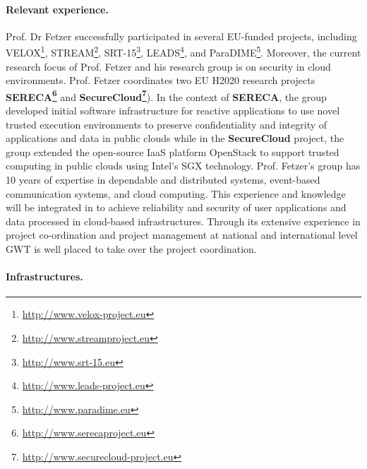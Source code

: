 \smallskip
\noindent
\paragraph{Relevant experience.}
Prof. Dr Fetzer successfully participated in several EU-funded projects, including
VELOX\footnote{\url{http://www.velox-project.eu}},
STREAM\footnote{\url{http://www.streamproject.eu}},
SRT-15\footnote{\url{http://www.srt-15.eu}},
LEADS\footnote{\url{http://www.leads-project.eu}}, and
ParaDIME\footnote{\url{http://www.paradime.eu}}.
Moreover, the current research focus of Prof. Fetzer and his research group is on security in cloud environments.
Prof. Fetzer coordinates two EU H2020 research projects \textbf{SERECA\footnote{\url{http://www.serecaproject.eu}}}
and \textbf{SecureCloud\footnote{\url{http://www.securecloud-project.eu}}}). %
In the context of \textbf{SERECA}, the group developed initial software infrastructure for reactive applications to use novel 
trusted execution environments to preserve confidentiality and integrity of applications and data in public clouds while in the \textbf{SecureCloud} project,
the group extended the open-source IaaS platform OpenStack to support trusted computing in public clouds using Intel's SGX technology.
Prof. Fetzer’s group has 10 years of expertise in dependable and distributed systems, event-based communication systems, and cloud computing. 
This experience and knowledge will be integrated in \proj to achieve reliability and security of user applications and data processed in cloud-based infrastructures.
Through its extensive experience in project co-ordination and project management at national and international level GWT is well placed to take over the project coordination. 

\smallskip
\noindent
\paragraph{Infrastructures.}


\smallskip
\noindent
